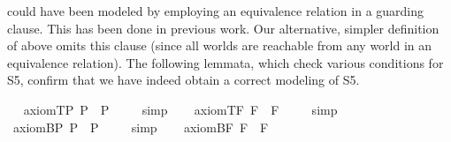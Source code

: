 \begin{isabellebody}
%
\isamarkuptrue%
%
\begin{isamarkuptext}%
\isa{{\isasymbox}} could have been modeled by employing an equivalence relation  in a 
  guarding clause. This has been done in previous work. Our alternative, simpler definition of 
  \isa{{\isasymbox}} above omits
  this clause (since all worlds are reachable from any world in an equivalence relation). The 
  following lemmata, which check various conditions for S5, confirm that we have indeed 
  obtain a correct modeling of S5.%
\end{isamarkuptext}%
\isamarkuptrue%
\ \isamarkupfalse%
\ axiom{\isacharunderscore}T{\isacharunderscore}P{\isacharcolon}\ {\isachardoublequoteopen}{\isacharbrackleft}\isactrlbold {\isasymbox}{\isasymphi}\isactrlsup P\ \isactrlbold {\isasymrightarrow}\ {\isasymphi}\isactrlsup P{\isacharbrackright}\ {\isacharequal}\ {\isasymtop}{\isachardoublequoteclose}%
\isadelimproof
\ %
\endisadelimproof
%
\isatagproof
{}\isamarkupfalse%
\ simp\ \isamarkupfalse%
%
\endisatagproof
{\isafoldproof}%
%
\isadelimproof
%
\endisadelimproof
\isanewline
\ \isamarkupfalse%
\ axiom{\isacharunderscore}T{\isacharunderscore}F{\isacharcolon}\ {\isachardoublequoteopen}{\isacharbrackleft}\isactrlbold {\isasymbox}{\isasymphi}\isactrlsup F\ \isactrlbold {\isasymrightarrow}\ {\isasymphi}\isactrlsup F{\isacharbrackright}\ {\isacharequal}\ {\isasymtop}{\isachardoublequoteclose}%
\isadelimproof
\ %
\endisadelimproof
%
\isatagproof
{}\isamarkupfalse%
\ simp\ \isamarkupfalse%
%
\endisatagproof
{\isafoldproof}%
%
\isadelimproof
%
\endisadelimproof
\isanewline
\isanewline
\ \isamarkupfalse%
\ axiom{\isacharunderscore}B{\isacharunderscore}P{\isacharcolon}\ {\isachardoublequoteopen}{\isacharbrackleft}{\isasymphi}\isactrlsup P\ \isactrlbold {\isasymrightarrow}\ \isactrlbold {\isasymbox}\isactrlbold {\isasymdiamond}{\isasymphi}\isactrlsup P{\isacharbrackright}\ {\isacharequal}\ {\isasymtop}{\isachardoublequoteclose}%
\isadelimproof
\ %
\endisadelimproof
%
\isatagproof
{}\isamarkupfalse%
\ simp\ \isamarkupfalse%
%
\endisatagproof
{\isafoldproof}%
%
\isadelimproof
%
\endisadelimproof
\isanewline
\ \isamarkupfalse%
\ axiom{\isacharunderscore}B{\isacharunderscore}F{\isacharcolon}\ {\isachardoublequoteopen}{\isacharbrackleft}{\isasymphi}\isactrlsup F\ \isactrlbold {\isasymrightarrow}\ \isactrlbold {\isasymbox}\isactrlbold {\isasymdiamond}{\isasymphi}\isactrlsup F{\isacharbrackright}\ {\isacharequal}\ {\isasymtop}{\isachardoublequoteclose}%

\end{isabellebody}
